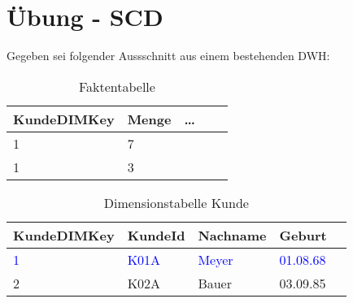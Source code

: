 \section{Übung - SCD}
\label{sec:uebung_04}
Gegeben sei folgender Aussschnitt aus einem bestehenden DWH:

\begin{table}[H]
  \centering
  \ttfamily
  \small
  \begin{tabular}{|l|l|l|l|l|}
    \hline
    \textbf{KundeDIMKey}  & \textbf{Menge} & \textbf{\dots}       \\
    \hline
    1                     & 7              &                      \\
    1                     & 3               &                     \\
    \hline
  \end{tabular}
  \caption{Faktentabelle}
\end{table}

\begin{table}[H]
  \centering
  \ttfamily
  \small
  \begin{tabular}{|l|l|l|l|l|}
    \hline
    \textbf{KundeDIMKey}  & \textbf{KundeId}        & \textbf{Nachname}       & \textbf{Geburt}             \\
    \hline
    \textcolor{blue}{1}   & \textcolor{blue}{K01A}  & \textcolor{blue}{Meyer} & \textcolor{blue}{01.08.68}  \\
    2                     & K02A                    & Bauer                   & 03.09.85                    \\
    \hline
  \end{tabular}
  \caption{Dimensionstabelle Kunde}
\end{table}